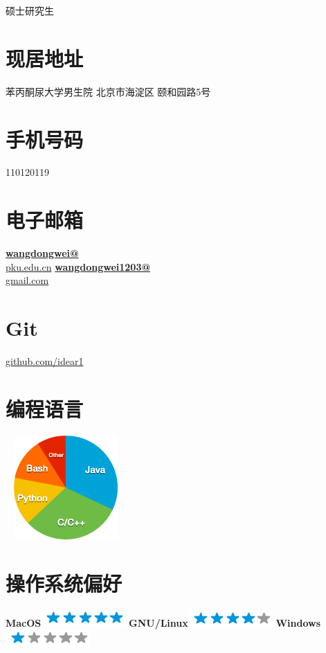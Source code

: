 \documentclass[]{friggeri-cv}
\begin{document}
      {硕士研究生}
      

\begin{aside}
  \section{现居地址}
    苯丙酮尿大学男生院
    北京市海淀区
    颐和园路5号%
    ~
  \section{手机号码}
    110120119
    ~
  \section{电子邮箱}
    \href{mailto:wangdongwei@pku.edu.cn}{\textbf{wangdongwei@}\\pku.edu.cn}
    \href{mailto:wangdongwei1203@gmail.com}{\textbf{wangdongwei1203@}\\gmail.com}
    ~
  \section{Git}
    \href{https://github.com/idear1}{github.com/idear1}
    ~
  \section{编程语言}
    ~
    \includegraphics[scale=0.7]{img/programming.png}
    ~
  \section{操作系统偏好}
    \textbf{MacOS}\includegraphics[scale=0.40]{img/5stars.png}
    \textbf{GNU/Linux}\includegraphics[scale=0.40]{img/4stars.png}
    \textbf{Windows}\includegraphics[scale=0.40]{img/1stars.png}
    ~

\end{aside}
\end{document}

